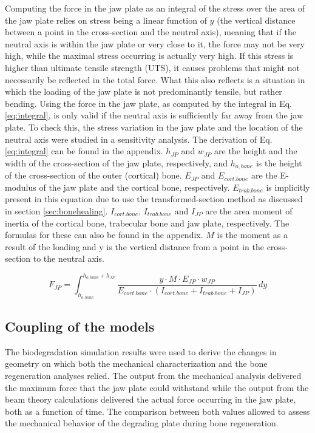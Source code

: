 
Computing the force in the jaw plate as an integral of the stress over the area of the jaw plate relies on stress being a linear function of $y$ (the vertical distance between a point in the cross-section and the neutral axis), meaning that if the neutral axis is within the jaw plate or very close to it, the force may not be very high, while the maximal stress occurring is actually very high. If this stress is higher than ultimate tensile strength (\gls{UTS}), it causes problems that might not necessarily be reflected in the total force. What this also reflects is a situation in which the loading of the jaw plate is not predominantly tensile, but rather bending. Using the force in the jaw plate, as computed by the integral in Eq. \ref{eq:integral}, is only valid if the neutral axis is sufficiently far away from the jaw plate. To check this, the stress variation in the jaw plate and the location of the neutral axis were studied in a sensitivity analysis. The derivation of Eq. \ref{eq:integral} can be found in the appendix. $h_{JP}$ and $w_{JP}$ are the height and the width of the cross-section of the jaw plate, respectively, and $h_{o,bone}$ is the height of the cross-section of the outer (cortical) bone. $E_{JP}$ and $E_{cort.bone}$ are the E-modulus of the jaw plate and the cortical bone, respectively. $E_{trab.bone}$ is implicitly present in this equation due to use the transformed-section method as discussed in section \ref{sec:bonehealing}. $I_{cort.bone}$, $I_{trab.bone}$ and $I_{JP}$ are the area moment of inertia of the cortical bone, trabecular bone and jaw plate, respectively. The formulas for these can also be found in the appendix. $M$ is the moment as a result of the loading and y is the vertical distance from a point in the cross-section to the neutral axis.

\begin{equation}
F_{JP}=\int_{h_{o,bone}}^{h_{o,bone}+h_{JP}} \frac{y \cdot M \cdot E_{JP} \cdot w_{JP}}{E_{cort.bone} \cdot (I_{cort.bone}+I_{trab.bone}+I_{JP})}  \,dy
\label{eq:integral}
\end{equation}


\subsection{Coupling of the models}

The biodegradation simulation results were used to derive the changes in geometry on which both the mechanical characterization and the bone regeneration analyses relied. The output from the mechanical analysis delivered the maximum force that the jaw plate could withstand while the output from the beam theory calculations delivered the actual force occurring in the jaw plate, both as a function of time. The comparison between both values allowed to assess the mechanical behavior of the degrading plate during bone regeneration.

